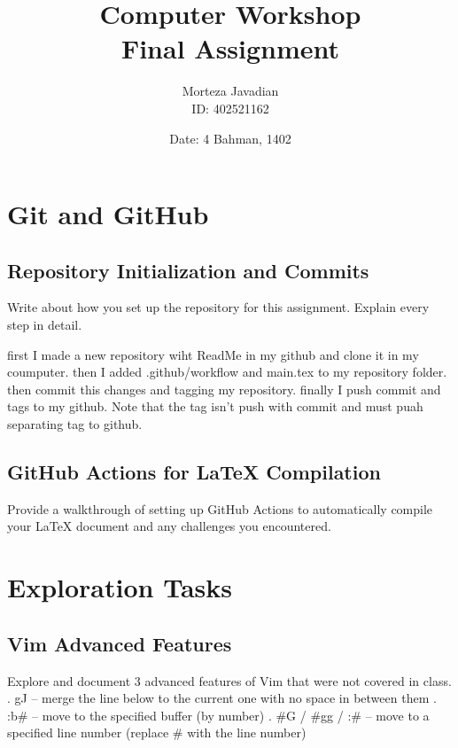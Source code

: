 \documentclass[titlepage]{article}
\title{\huge Computer Workshop\\Final Assignment}
\author{Morteza Javadian\\ID: 402521162}
\date{Date: 4 Bahman, 1402}
\begin{document}
	
	\maketitle
	
	\renewcommand{\contentsname }{ TABLE OF CONTENTS}
	
	\tableofcontents
	\let\LaTeXStandardTableOfContents\tableofcontents
	
	\renewcommand{\tableofcontents}
	{
		\begingroup
		\renewcommand{\bfseries}{\relax}
		\LaTeXStandardTableOfContents
		\endgroup
	}

	\newpage
	
	\section{Git and GitHub}
	\subsection{Repository Initialization and Commits}
	Write about how you set up the repository for this assignment. Explain every step in detail.
	
	first I made a new repository wiht ReadMe in my github and clone it in my coumputer. then I added .github/workflow and main.tex to my repository folder. then commit this changes and tagging my repository. finally I push commit and tags to my github. Note that the tag isn't push with commit and must puah separating tag to github.
	
	\subsection{GitHub Actions for LaTeX Compilation}
	Provide a walkthrough of setting up GitHub Actions to automatically compile your LaTeX document and any challenges you encountered.
	
	
	
	
	
	\section{Exploration Tasks}
	\subsection{Vim Advanced Features}
	Explore and document 3 advanced features of Vim that were not covered in class.
	. gJ – merge the line below to the current one with no space in between them
	. :b#  – move to the specified buffer (by number)
	. #G / #gg / :# – move to a specified line number (replace # with the line number)
	
\end{document}
